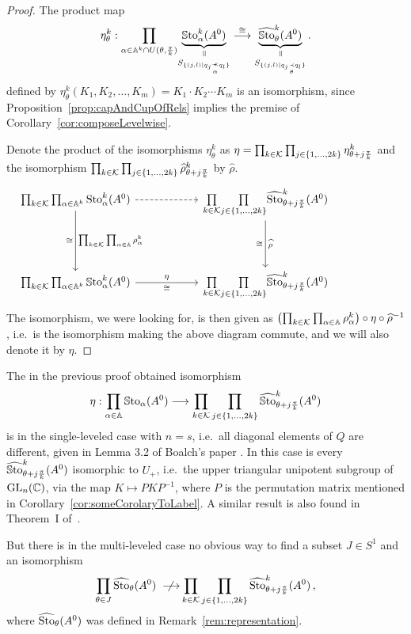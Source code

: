 \begin{proof}
  The product map
  \[
    \eta_\theta^k:
    \underset{\alpha\in\A^k\cap U(\theta,\frac{\pi}{k})}\prod
    \underset{S_{\{(j,l)\mid q_j\myrel{\alpha}q_l\}}}{%
      \underset{\text{\rotatebox[origin=c]{-90}{$=$}}}{\underbrace{%
          \SSto_\alpha^k(A^0)}}}
    \overset{\cong}{\longrightarrow}
    \underset{S_{\{(j,l) \mid q_j \underset{\theta}{\prec} q_l \}}}{%
      \underset{\text{\rotatebox[origin=c]{-90}{$=$}}}{\underbrace{%
          \hat\SSto_\theta^k(A^0)}}}
    \,.
  \]
  defined by $\eta_\theta^k(K_1,K_2,\dots,K_m) = K_1\cdot K_2\cdots K_m$ is an
  isomorphism, since Proposition~\ref{prop:capAndCupOfRels} implies the premise
  of Corollary~\ref{cor:composeLevelwise}.

  Denote the product of the isomorphisms $\eta_\theta^k$ as $\eta=
  \prod_{k\in\mathcal{K}}\prod_{j\in\{1,\dots,2k\}}
  \eta_{\theta+j\frac{\pi}{k}}^k$ and the isomorphism
  $\prod_{k\in\mathcal{K}}\prod_{j\in\{1,\dots,2k\}}\widehat\rho_{\theta+j\frac{\pi}{k}}^k$
  by $\hat\rho$.
  \[ \begin{tikzcd}[column sep=2cm,row sep=1.5cm]
    \prod_{k\in\cK}\prod_{\alpha\in\A^k}\Sto_\alpha^k(A^0)
    \rar[dashed]
    \arrow[d,"\prod_{k\in\cK}\prod_{\alpha\in\A}\rho_{\alpha}^k","\cong"']&
    \underset{k\in\cK}{\prod}\underset{j\in\{1,\dots,2k\}}{\prod}
    \hat\Sto_{\theta+j\frac{\pi}{k}}^k(A^0)
    \arrow[d,"\hat\rho","\cong"']&
    \\
    \prod_{k\in\cK}\prod_{\alpha\in\A^k}\SSto_\alpha^k(A^0)
    \arrow[r,"\eta","\cong"']&
    \underset{k\in\cK}{\prod}\underset{j\in\{1,\dots,2k\}}{\prod}
    \hat\SSto_{\theta+j\frac{\pi}{k}}^k(A^0)
  \end{tikzcd} \]
  The isomorphism, we were looking for, is then given as
  $\bigl(\prod_{k\in\mathcal{K}}\prod_{\alpha\in\mathbb{A}}\rho_{\alpha}^k\bigr)
  \circ \eta \circ \widehat\rho^{-1}$, i.e.\ is the isomorphism making the above
  diagram commute, and we will also denote it by $\eta$.
\end{proof}
\begin{rem}
  The in the previous proof obtained isomorphism
  \[
    \eta: \prod_{\alpha\in\mathbb{A}}\operatorname{\mathbb{S}to}_{\alpha}(A^0) \longrightarrow
    \prod_{k\in\mathcal{K}} \prod_{j\in\{1,\dots,2k\}}
    \widehat{\operatorname{\mathbb{S}to}}_{\theta+j\frac{\pi}{k}}^k(A^0)
  \]
  is in the single-leveled case with $n=s$, i.e.\ all diagonal elements of $Q$
  are different, given in Lemma 3.2 of Boalch's paper \cite[Lem.3.2]{boalch}.
  In this case is every $\widehat{\operatorname{\mathbb{S}to}}_{\theta+j\frac{\pi}{k}}^k(A^0)$ isomorphic to
  $U_+$, i.e.\ the upper triangular unipotent subgroup of $\operatorname{GL}_n(\mathbb{C})$, via the
  map $K\mapsto PKP^{-1}$, where $P$ is the permutation matrix mentioned in
  Corollary~\ref{cor:someCorolaryToLabel}.
  A similar result is also found in Theorem~I of~\cite{BJL1979Birkhoff}.
\end{rem}
But there is in the multi-leveled case no obvious way to find a subset $J\in S^1$
and an isomorphism
\[
  \prod_{\theta\in J} \widehat{\operatorname{Sto}}_{\theta}(A^0)
  ~~\not{\!\!\!\!\longrightarrow}
  \prod_{k\in\mathcal{K}}\prod_{j\in\{1,\dots,2k\}}
  \widehat{\operatorname{Sto}}_{\theta+j\frac{\pi}{k}}^k(A^0)\,,
\]
where $\widehat{\operatorname{Sto}}_{\theta}(A^0)$ was defined in Remark~\ref{rem:representation}.

